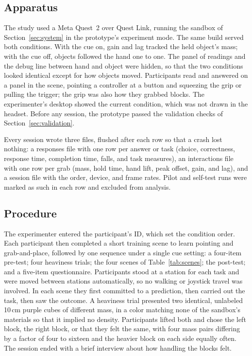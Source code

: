 \documentclass[sigconf,nonacm]{acmart}
\begin{document}
\subsection{Apparatus}
The study used a Meta Quest~2 over Quest Link, running the sandbox of
Section~\ref{sec:system} in the prototype's experiment mode. The same build served both
conditions. With the cue on, gain and lag tracked the held object's mass; with the cue
off, objects followed the hand one to one. The panel of readings and the debug line
between hand and object were hidden, so that the two conditions looked identical except
for how objects moved. Participants read and answered on a panel in the scene, pointing a
controller at a button and squeezing the grip or pulling the trigger; the grip was also
how they grabbed blocks. The experimenter's desktop showed the current condition, which
was not drawn in the headset. Before any session, the prototype passed the validation
checks of Section~\ref{sec:validation}.

Every session wrote three files, flushed after each row so that a crash lost nothing: a
responses file with one row per answer or task (choice, correctness, response time,
completion time, falls, and task measures), an interactions file with one row per grab
(mass, hold time, hand lift, peak offset, gain, and lag), and a session file with the order,
device, and frame rates. Pilot and self-test runs were marked as such in each row and
excluded from analysis.

\subsection{Procedure}
The experimenter entered the participant's ID, which set the condition order. Each
participant then completed a short training scene to learn pointing and grab-and-place,
followed by one sequence under a single cue setting: a four-item pre-test; four heaviness
trials; the four scenes of Table~\ref{tab:scenes}; the post-test; and a five-item
questionnaire. Participants stood at a station for each task and were moved
between stations automatically, so no walking or joystick travel was involved. In each
scene they first committed to a prediction, then carried out the task, then saw the
outcome. A heaviness trial presented two identical, unlabeled 10\,cm purple cubes of different mass,
in a color matching none of the sandbox's materials so that it implied no density.
Participants lifted both and chose the left block, the right block, or that they felt the
same, with four mass pairs differing by a factor of four to sixteen and the heavier block on
each side equally often. The session ended with a brief interview about how handling the
blocks felt.
\end{document}

